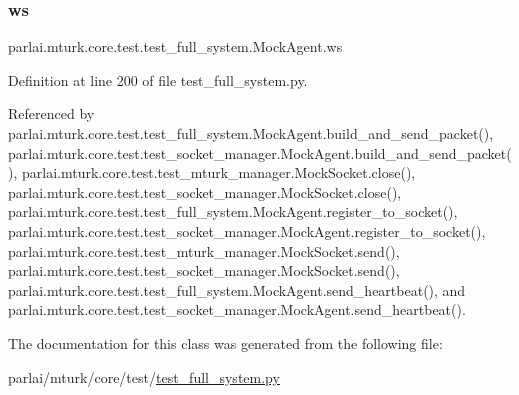 \mbox{\label{classparlai_1_1mturk_1_1core_1_1test_1_1test__full__system_1_1MockAgent_a2870f5b01b6d901d44d2dae99ff6a263}} 
\subsubsection{\texorpdfstring{ws}{ws}}
{\footnotesize\ttfamily parlai.\+mturk.\+core.\+test.\+test\+\_\+full\+\_\+system.\+Mock\+Agent.\+ws}



Definition at line 200 of file test\+\_\+full\+\_\+system.\+py.



Referenced by parlai.\+mturk.\+core.\+test.\+test\+\_\+full\+\_\+system.\+Mock\+Agent.\+build\+\_\+and\+\_\+send\+\_\+packet(), parlai.\+mturk.\+core.\+test.\+test\+\_\+socket\+\_\+manager.\+Mock\+Agent.\+build\+\_\+and\+\_\+send\+\_\+packet(), parlai.\+mturk.\+core.\+test.\+test\+\_\+mturk\+\_\+manager.\+Mock\+Socket.\+close(), parlai.\+mturk.\+core.\+test.\+test\+\_\+socket\+\_\+manager.\+Mock\+Socket.\+close(), parlai.\+mturk.\+core.\+test.\+test\+\_\+full\+\_\+system.\+Mock\+Agent.\+register\+\_\+to\+\_\+socket(), parlai.\+mturk.\+core.\+test.\+test\+\_\+socket\+\_\+manager.\+Mock\+Agent.\+register\+\_\+to\+\_\+socket(), parlai.\+mturk.\+core.\+test.\+test\+\_\+mturk\+\_\+manager.\+Mock\+Socket.\+send(), parlai.\+mturk.\+core.\+test.\+test\+\_\+socket\+\_\+manager.\+Mock\+Socket.\+send(), parlai.\+mturk.\+core.\+test.\+test\+\_\+full\+\_\+system.\+Mock\+Agent.\+send\+\_\+heartbeat(), and parlai.\+mturk.\+core.\+test.\+test\+\_\+socket\+\_\+manager.\+Mock\+Agent.\+send\+\_\+heartbeat().



The documentation for this class was generated from the following file\+:\begin{DoxyCompactItemize}
\item 
parlai/mturk/core/test/\hyperlink{test_2test__full__system_8py}{test\+\_\+full\+\_\+system.\+py}\end{DoxyCompactItemize}
